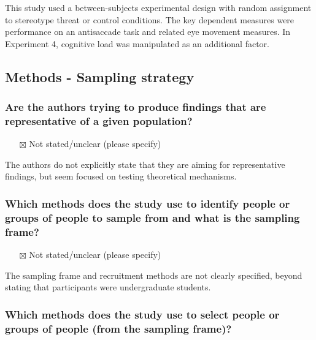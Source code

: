 \documentclass[
  doc, a4paper]{apa7}
\providecommand{\tightlist}{%
  \setlength{\itemsep}{0pt}\setlength{\parskip}{0pt}}
\begin{document}
This study used a between-subjects experimental design with random assignment to stereotype threat or control conditions. The key dependent measures were performance on an antisaccade task and related eye movement measures. In Experiment 4, cognitive load was manipulated as an additional factor.

\subsection{Methods - Sampling strategy}\label{methods---sampling-strategy}

\subsubsection{Are the authors trying to produce findings that are representative of a given population?}\label{are-the-authors-trying-to-produce-findings-that-are-representative-of-a-given-population}

\begin{itemize}
\tightlist
\item[$\boxtimes$]
  Not stated/unclear (please specify)
\end{itemize}

The authors do not explicitly state that they are aiming for representative findings, but seem focused on testing theoretical mechanisms.

\subsubsection{Which methods does the study use to identify people or groups of people to sample from and what is the sampling frame?}\label{which-methods-does-the-study-use-to-identify-people-or-groups-of-people-to-sample-from-and-what-is-the-sampling-frame}

\begin{itemize}
\tightlist
\item[$\boxtimes$]
  Not stated/unclear (please specify)
\end{itemize}

The sampling frame and recruitment methods are not clearly specified, beyond stating that participants were undergraduate students.

\subsubsection{Which methods does the study use to select people or groups of people (from the sampling frame)?}\label{which-methods-does-the-study-use-to-select-people-or-groups-of-people-from-the-sampling-frame}
\end{document}
